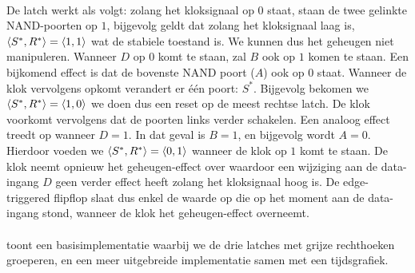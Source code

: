 \paragraph{}
De latch werkt als volgt: zolang het kloksignaal op $0$ staat, staan de twee gelinkte NAND-poorten op $1$, bijgevolg geldt dat zolang het kloksignaal laag is, $\left\langle S^*,R^* \right\rangle=\left\langle 1,1 \right\rangle$ wat de stabiele toestand is. We kunnen dus het geheugen niet manipuleren. Wanneer $D$ op $0$ komt te staan, zal $B$ ook op $1$ komen te staan. Een bijkomend effect is dat de bovenste NAND poort ($A$) ook op $0$ staat. Wanneer de klok vervolgens opkomt verandert er \'e\'en poort: $S^*$. Bijgevolg bekomen we $\left\langle S^*,R^* \right\rangle=\left\langle 1,0 \right\rangle$ we doen dus een reset op de meest rechtse latch. De klok voorkomt vervolgens dat de poorten links verder schakelen. Een analoog effect treedt op wanneer $D=1$. In dat geval is $B=1$, en bijgevolg wordt $A=0$. Hierdoor voeden we $\left\langle S^*,R^* \right\rangle=\left\langle 0,1 \right\rangle$ wanneer de klok op $1$ komt te staan. De klok neemt opnieuw het geheugen-effect over waardoor een wijziging aan de data-ingang $D$ geen verder effect heeft zolang het kloksignaal hoog is. De edge-triggered flipflop slaat dus enkel de waarde op die op het moment aan de data-ingang stond, wanneer de klok het geheugen-effect overneemt.

\paragraph{}
 toont een basisimplementatie waarbij we de drie latches met grijze rechthoeken groeperen, en een meer uitgebreide implementatie samen met een tijdsgrafiek.

